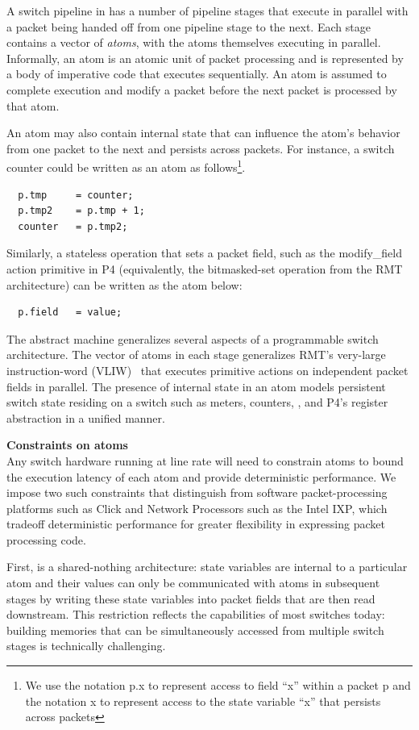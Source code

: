 A switch pipeline in \absmachine has a number of pipeline stages that execute
in parallel with a packet being handed off from one pipeline stage to the next.
Each stage contains a vector of \textit{atoms}, with the atoms themselves
executing in parallel. Informally, an atom is an atomic unit of packet
processing and is represented by a body of imperative code that executes
sequentially. An atom is assumed to complete execution and modify a packet
before the next packet is processed by that atom.

An atom may also contain internal state that can influence the atom's behavior
from one packet to the next and persists across packets. For instance, a switch
counter could be written as an atom as follows\footnote{We use the notation p.x
  to represent access to field ``x'' within a packet p and the notation x to
represent access to the state variable ``x'' that persists across packets}.
\begin{verbatim}
  p.tmp     = counter;
  p.tmp2    = p.tmp + 1;
  counter   = p.tmp2;
\end{verbatim}
Similarly, a stateless operation that sets a packet field, such as the
modify\_field action primitive in P4 (equivalently, the bitmasked-set operation
from the RMT architecture) can be written as the atom below:
\begin{verbatim}
  p.field   = value;
\end{verbatim}

The \absmachine abstract machine generalizes several aspects of a programmable
switch architecture. The vector of atoms in each stage generalizes RMT's
very-large instruction-word (VLIW)~\cite{rmt} that executes primitive actions
on independent packet fields in parallel. The presence of internal state in an
atom models persistent switch state residing on a switch such as meters,
counters, , and P4's register abstraction in a unified manner.

\textbf{Constraints on atoms} \\

Any switch hardware running at line rate will need to constrain atoms to bound
the execution latency of each atom and provide deterministic performance. We
impose two such constraints that distinguish \absmachine from software
packet-processing platforms such as Click and Network Processors such as the
Intel IXP, which tradeoff deterministic performance for greater flexibility in
expressing packet processing code.

First, \absmachine is a shared-nothing architecture: state variables are internal to
a particular atom and their values can only be communicated with atoms in
subsequent stages by writing these state variables into packet fields that are
then read downstream.  This restriction reflects the capabilities of most
switches today: building memories that can be simultaneously accessed from
multiple switch stages is technically challenging.

